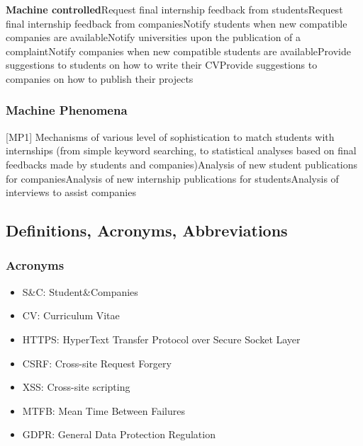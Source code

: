 \documentclass{article}
\begin{document}
\textbf{Machine controlled}\newline
[SMC1] Request final internship feedback from students\newline
[SMC2] Request final internship feedback from companies\newline
[SMC3] Notify students when new compatible companies are available\newline
[SMC4] Notify universities upon the publication of a complaint\newline
[SMC5] Notify companies when new compatible students are available\newline
[SMC6] Provide suggestions to students on how to write their CV\newline
[SMC7] Provide suggestions to companies on how to publish their projects\newline

\subsubsection{Machine Phenomena}
[MP1] Mechanisms of various level of sophistication to match students with internships (from simple keyword searching, to statistical analyses based on final feedbacks made by students and companies)\newline
[MP2] Analysis of new student publications for companies\newline
[MP3] Analysis of new internship publications for students\newline
[MP4] Analysis of interviews to assist companies\newline

\subsection{Definitions, Acronyms, Abbreviations}
\subsubsection{Acronyms}
\begin{itemize}
    \item  S\&C:  Student\&Companies
    \item  CV: Curriculum Vitae
    \item HTTPS: HyperText Transfer Protocol over Secure Socket Layer
    \item CSRF: Cross-site Request Forgery 
    \item XSS: Cross-site scripting 
    \item MTFB: Mean Time Between Failures
    \item GDPR: General Data Protection Regulation
\end{itemize}
\end{document}
